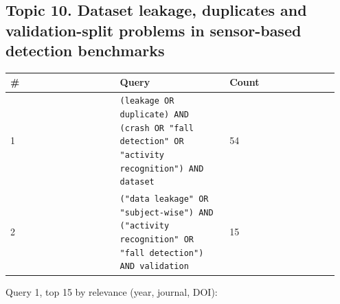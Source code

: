\subsection*{Topic 10. Dataset leakage, duplicates and validation-split problems in sensor-based detection benchmarks}

{\scriptsize\raggedright
\begin{longtable}{p{0.317\linewidth}p{0.317\linewidth}p{0.317\linewidth}}
\toprule
\# & Query & Count \\
\midrule
\endhead
1 & \texttt{(leakage OR duplicate) AND (crash OR "fall detection" OR "activity recognition") AND dataset} & 54 \\
2 & \texttt{("data leakage" OR "subject-wise") AND ("activity recognition" OR "fall detection") AND validation} & 15 \\
\bottomrule
\end{longtable}}

Query 1, top 15 by relevance (year, journal, DOI):

